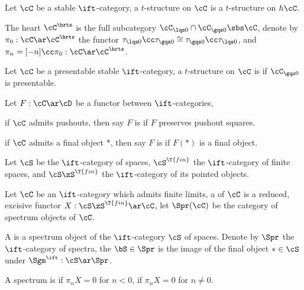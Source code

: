 \documentclass[article, a4paper, twoside]{universal}
\begin{document}
\begin{dfn}[1.2.1.4, 1.2.1.11]
    Let $\cC$ be a stable $\ift$-category, a $t$-structure on $\cC$ is a $t$-structure on $h\cC$.

    The heart $\cC^{\hrts}$ is the full subcategory $\cC_{\lqs0}\cap\cC_{\gqs0}\sbs\cC$, denote by $\pi_{0}:\cC\ar\cC^{\hrts}$ the functor $\tau_{\lqs0}\cc\tau_{\gqs0}\cong\tau_{\gqs0}\cc\tau_{\lqs0}$, and $\pi_{n}=[-n]\cc\pi_{0}:\cC\ar\cC^{\hrts}$.
\end{dfn}


\begin{thm}[1.4.4.12]
    Let $\cC$ be a presentable stable $\ift$-category, a $t$-structure on $\cC$ is  if $\cC_{\gqs0}$ is presentable.

\end{thm}



\begin{dfn}[1.4.2.1]
    Let $F:\cC\ar\cD$ be a functor between $\ift$-categories,
    \begin{enr}[label=(\arabic*)]
        \item if $\cC$ admits pushouts, then say $F$ is  if $F$ preserves pushout squares.
        \item if $\cC$ admits a final object $*$, then say $F$ is  if $F(*)$ is a final object.
    \end{enr}
\end{dfn}


\begin{dfn}[1.4.2.5, 1.4.2.8, 1.4.3.1, 1.4.4.5]
    Let $\cS$ be the $\ift$-category of spaces, $\cS^{\T{fin}}$ the $\ift$-category of finite spaces, and $\cS\zS^{\T{fin}}$ the $\ift$-category of its pointed objects.

    Let $\cC$ be an $\ift$-category which admits finite limits, a  of $\cC$ is a reduced, excisive functor $X:\cS\zS^{\T{fin}}\ar\cC$, let $\Spr(\cC)$ be the category of spectrum objects of $\cC$.

    A  is a spectrum object of the $\ift$-category $\cS$ of spaces. Denote by $\Spr$ the $\ift$-category of spectra, the  $\bS\in\Spr$ is the image of the final object $*\in\cS$ under $\Sgm^{\ift}:\cS\ar\Spr$.

    A spectrum is  if $\pi_{n}X=0$ for $n<0$,  if $\pi_{n}X=0$ for $n\neq0$.
\end{dfn}
\end{document}
